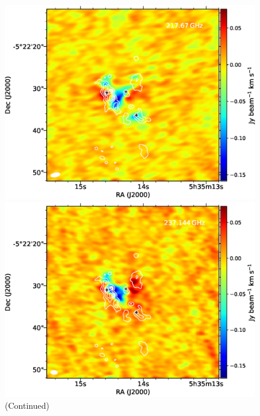 \begin{figure}[H]
\begin{center}
\begin{minipage}{0.98\textwidth} 
\begin{center}
\begin{minipage}{0.48\textwidth}
\begin{center}
\includegraphics[width=0.98\textwidth]{OrionKL/mom0/217.67mom0_3-7.eps}
\end{center}
\end{minipage}
\begin{minipage}{0.48\textwidth}
\begin{center}
\includegraphics[width=0.98\textwidth]{OrionKL/mom0/237.144mom0_3-7.eps}
\end{center}
\end{minipage}
\end{center}
\end{minipage}

\caption{(Continued)}
\end{center}
\end{figure}

